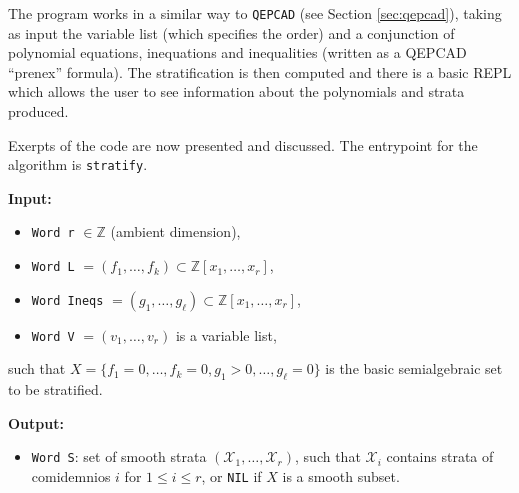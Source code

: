 \documentclass[
]{book}
\providecommand{\tightlist}{%
  \setlength{\itemsep}{0pt}\setlength{\parskip}{0pt}}
\theoremstyle{definition}
\theoremstyle{definition}
\theoremstyle{definition}
\theoremstyle{definition}
\theoremstyle{remark}
\begin{document}
The program works in a similar way to \texttt{QEPCAD} (see Section \ref{sec:qepcad}), taking as input the variable list (which specifies the order) and a conjunction of polynomial equations, inequations and inequalities (written as a QEPCAD ``prenex'' formula). The stratification is then computed and there is a basic REPL which allows the user to see information about the polynomials and strata produced.

Exerpts of the code are now presented and discussed. The entrypoint for the algorithm is \texttt{stratify}.

\textbf{Input:}

\begin{itemize}
\tightlist
\item
  \texttt{Word\ r} \(\in \mathbb{Z}\) (ambient dimension),
\item
  \texttt{Word\ L} \(= (f_1,\ldots,f_k) \subset \mathbb{Z}[x_1,\ldots,x_r]\),
\item
  \texttt{Word\ Ineqs} \(= (g_1,\ldots,g_\ell) \subset \mathbb{Z}[x_1,\ldots,x_r]\),
\item
  \texttt{Word\ V} \(= (v_1,\ldots,v_r)\) is a variable list,
\end{itemize}

such that \(X = \{ f_1 = 0, \ldots, f_k = 0, g_1 > 0, \ldots, g_\ell = 0 \}\) is the basic semialgebraic set to be stratified.

\textbf{Output:}

\begin{itemize}
\tightlist
\item
  \texttt{Word\ S}: set of smooth strata \((\mathcal{X}_1,\ldots,\mathcal{X}_r)\), such that \(\mathcal{X}_i\) contains strata of comidemnios \(i\) for \(1 \le i \le r\), or \texttt{NIL} if \(X\) is a smooth subset.
\end{itemize}
\end{document}
